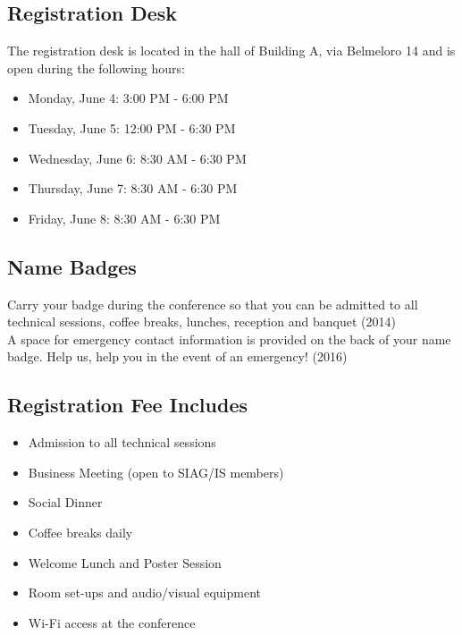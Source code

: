 \begin{multicols}{2}
\section*{Registration Desk}

The registration desk is located in the hall of Building A, via Belmeloro 14 and is open during the following hours:

\begin{itemize}
\item Monday, June 4: 3:00 PM - 6:00 PM
\item Tuesday, June 5: 12:00 PM - 6:30 PM
\item Wednesday, June 6: 8:30 AM - 6:30 PM
\item Thursday, June 7: 8:30 AM - 6:30 PM
\item Friday, June 8: 8:30 AM - 6:30 PM
\end{itemize}

\subsection*{Name Badges} 
Carry your badge during the conference so that you can be admitted to all technical sessions, coffee breaks, lunches, reception and banquet (2014)\\
A space for emergency contact information is provided on the back of your name badge. Help us, help you in the event of an emergency! (2016)

\subsection*{Registration Fee Includes}

\begin{itemize}
\item Admission to all technical sessions
\item Business Meeting (open to SIAG/IS members)
\item Social Dinner
\item Coffee breaks daily
\item Welcome Lunch and Poster Session
\item Room set-ups and audio/visual equipment
\item Wi-Fi access at the conference
\end{itemize}


\end{multicols}
